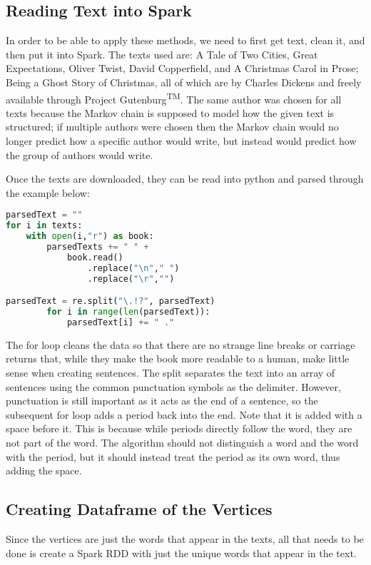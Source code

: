\documentclass[9pt,twocolumn,twoside]{idsi}
\begin{document}
\subsection{Reading Text into Spark}
In order to be able to apply these methods, we need to first get text, clean it, and then put it into Spark. The texts used are: A Tale of Two Cities, Great Expectations, Oliver Twist, David Copperfield, and A Christmas Carol in Prose; Being a Ghost Story of Christmas, all of which are by Charles Dickens and freely available through Project Gutenburg\textsuperscript{TM}. The same author was chosen for all texts because the Markov chain is supposed to model how the given text is structured; if multiple authors were chosen then the Markov chain would no longer predict how a specific author would write, but instead would predict how the group of authors would write.

Once the texts are downloaded, they can be read into python and parsed through the example below:
\begin{lstlisting}[language=python]
parsedText = ""
for i in texts:
    with open(i,"r") as book:
        parsedTexts += " " + 
            book.read()
                .replace("\n"," ")
                .replace("\r","")

parsedText = re.split("\.!?", parsedText) 
        for i in range(len(parsedText)):
            parsedText[i] += " ."
\end{lstlisting}
The for loop cleans the data so that there are no strange line breaks or carriage returns that, while they make the book more readable to a human, make little sense when creating sentences. The split separates the text into an array of sentences using the common punctuation symbols as the delimiter. However, punctuation is still important as it acts as the end of a sentence, so the subsequent for loop adds a period back into the end. Note that it is added with a space before it. 
This is because while periods directly follow the word, they are not part of the word. The algorithm should not distinguish a word and the word with the period, but it should instead treat the period as its own word, thus adding the space. 

\subsection{Creating Dataframe of the Vertices}
Since the vertices are just the words that appear in the texts, all that needs to be done is create a Spark RDD with just the unique words that appear in the text. 
\end{document}
